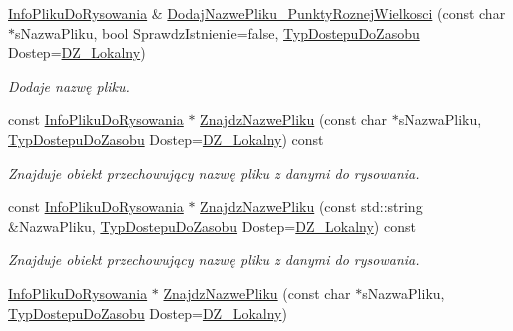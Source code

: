 \begin{DoxyCompactItemize}
\mbox{\hyperlink{class_pz_g_1_1_info_pliku_do_rysowania}{Info\+Pliku\+Do\+Rysowania}} \& \mbox{\hyperlink{class_pz_g_1_1_lacze_do_g_n_u_plota_a963eeeba41fea78ad1ad107baf8d4b36}{Dodaj\+Nazwe\+Pliku\+\_\+\+Punkty\+Roznej\+Wielkosci}} (const char $\ast$s\+Nazwa\+Pliku, bool Sprawdz\+Istnienie=false, \mbox{\hyperlink{namespace_pz_g_af74528dea7061dcb07cf44f315703cf4}{Typ\+Dostepu\+Do\+Zasobu}} Dostep=\mbox{\hyperlink{namespace_pz_g_af74528dea7061dcb07cf44f315703cf4ab239a07233614b519b0f2f5ca8af7826}{D\+Z\+\_\+\+Lokalny}})
\begin{DoxyCompactList}\small\item\em Dodaje nazwę pliku. \end{DoxyCompactList}\item 
const \mbox{\hyperlink{class_pz_g_1_1_info_pliku_do_rysowania}{Info\+Pliku\+Do\+Rysowania}} $\ast$ \mbox{\hyperlink{class_pz_g_1_1_lacze_do_g_n_u_plota_a9f64d84045ed54664807420e755a1ec5}{Znajdz\+Nazwe\+Pliku}} (const char $\ast$s\+Nazwa\+Pliku, \mbox{\hyperlink{namespace_pz_g_af74528dea7061dcb07cf44f315703cf4}{Typ\+Dostepu\+Do\+Zasobu}} Dostep=\mbox{\hyperlink{namespace_pz_g_af74528dea7061dcb07cf44f315703cf4ab239a07233614b519b0f2f5ca8af7826}{D\+Z\+\_\+\+Lokalny}}) const
\begin{DoxyCompactList}\small\item\em Znajduje obiekt przechowujący nazwę pliku z danymi do rysowania. \end{DoxyCompactList}\item 
const \mbox{\hyperlink{class_pz_g_1_1_info_pliku_do_rysowania}{Info\+Pliku\+Do\+Rysowania}} $\ast$ \mbox{\hyperlink{class_pz_g_1_1_lacze_do_g_n_u_plota_a18cd7faad7325343107a93db114cb290}{Znajdz\+Nazwe\+Pliku}} (const std\+::string \&Nazwa\+Pliku, \mbox{\hyperlink{namespace_pz_g_af74528dea7061dcb07cf44f315703cf4}{Typ\+Dostepu\+Do\+Zasobu}} Dostep=\mbox{\hyperlink{namespace_pz_g_af74528dea7061dcb07cf44f315703cf4ab239a07233614b519b0f2f5ca8af7826}{D\+Z\+\_\+\+Lokalny}}) const
\begin{DoxyCompactList}\small\item\em Znajduje obiekt przechowujący nazwę pliku z danymi do rysowania. \end{DoxyCompactList}\item 
\mbox{\hyperlink{class_pz_g_1_1_info_pliku_do_rysowania}{Info\+Pliku\+Do\+Rysowania}} $\ast$ \mbox{\hyperlink{class_pz_g_1_1_lacze_do_g_n_u_plota_a5100a047b8a1490dcaa6f6bcc338862a}{Znajdz\+Nazwe\+Pliku}} (const char $\ast$s\+Nazwa\+Pliku, \mbox{\hyperlink{namespace_pz_g_af74528dea7061dcb07cf44f315703cf4}{Typ\+Dostepu\+Do\+Zasobu}} Dostep=\mbox{\hyperlink{namespace_pz_g_af74528dea7061dcb07cf44f315703cf4ab239a07233614b519b0f2f5ca8af7826}{D\+Z\+\_\+\+Lokalny}})

\end{DoxyCompactItemize}
